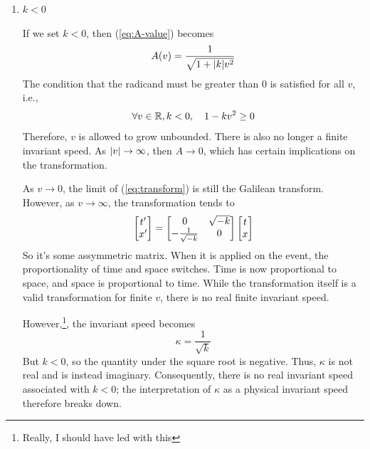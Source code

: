 \begin{solution_pset}
\begin{enumerate}[(1)]
				This is precisely the classical Galilean transformations.
				Thus, when we set $k=0$, we recover the Galilean transformation,
				where the invariant speed is pushed to infinity, 
				and there is no finite invariant speed.

				This is a \textbf{valid option}, and is in fact the assumption
				adopted by Newtonian and other classical mechanics theories.

			\item $k < 0$

				If we set $k<0$, then (\ref{eq:A-value}) becomes
				\begin{equation}
					\label{eq:A-transform-k<0}
					A(v) = \frac{1}{\sqrt{1+\abs{k}v^2}} 
				\end{equation}
				The condition that the radicand must be greater than 0 is
				satisfied for all $v$, i.e.,
				\[
					\forall v \in \mathbb{R}, k<0, \quad 1 - k v^2 \geq 0
				\]
				Therefore, $v$ is allowed to grow unbounded.  
				There is also no longer a finite invariant speed.
				As $\abs{v}\to\infty$, then
				$A\to 0$, which has certain implications on the transformation.

				As $v\to 0$, the limit of (\ref{eq:transform}) is still 
				the Galilean transform. However, as $v\to\infty$, the transformation
				tends to
				\begin{equation}
					\label{eq:transform-k<0}
				    \bmqty{
				    	t'\\x'
				    } 
					=
					\bmqty{
						0 & \sqrt{-k} \\
						-\frac{1}{\sqrt{-k}} & 0
					} 
					\bmqty{
						t\\x
					} 
				\end{equation}
				So it's some assymmetric matrix. When it is
				applied on the event, the proportionality of time and space switches.
				Time is now proportional to space, and space is proportional to time.
				While the transformation itself is a valid transformation for finite $v$,
				there is no real finite invariant speed.
				
				However,\footnote{Really, I should have led with this}, the invariant speed
				becomes 
				\[
					\kappa = \frac{1}{\sqrt{k}} 
				\]
				But $k<0$, so the quantity under the square root is negative.
				Thus, $\kappa$ is not real and is instead imaginary.
				Consequently, there is no real invariant speed associated with
				$k<0$; the interpretation of $\kappa$ as a physical invariant
				speed therefore breaks down.


\end{enumerate}
\end{solution_pset}
